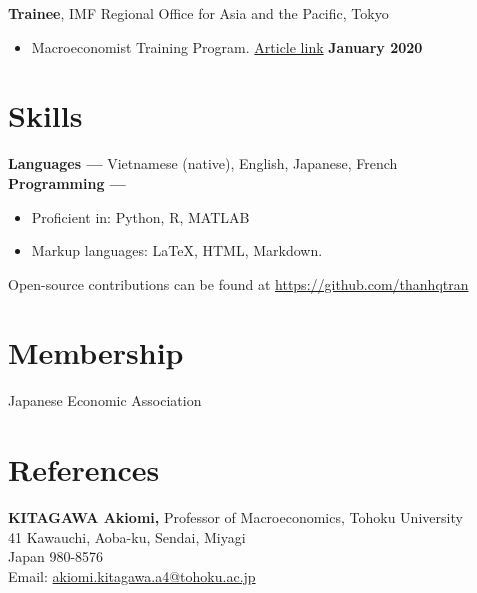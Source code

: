 \documentclass[margin,line]{res}
\begin{document}
\begin{resume}
{\bf Trainee}, IMF Regional Office for Asia and the Pacific, Tokyo
\vspace*{.05in}
\begin{itemize}
\item[ ] Macroeconomist Training Program. \href{https://www.imf.org/en/Countries/ResRep/OAP-Home/~/link.aspx?_id=C2F64E8412B64A86BD37DDEB8439312B&_z=z}{Article link} \hfill {\bf January 2020}
\end{itemize}


\section{\sc Skills}
{\bf Languages ---}
\vspace*{.05in}
Vietnamese (native), English, Japanese, French \\
{\bf Programming ---}
\vspace*{.05in}
\begin{itemize}
	\item Proficient in: Python, R, MATLAB
	\item Markup languages: \LaTeX, HTML, Markdown.
\end{itemize}
Open-source contributions can be found at \url{https://github.com/thanhqtran}

\section{\sc Membership}
Japanese Economic Association

\newpage




%


\section{\sc References}
\vspace*{.05in}
\parbox{\textwidth}{
{\bf KITAGAWA Akiomi,} Professor of Macroeconomics, Tohoku University \\
41 Kawauchi, Aoba-ku, Sendai, Miyagi \\
Japan 980-8576 \\
Email: \href{mailto:akiomi.kitagawa.a4@tohoku.ac.jp}{akiomi.kitagawa.a4@tohoku.ac.jp}} \\


\end{resume}
\end{document}
